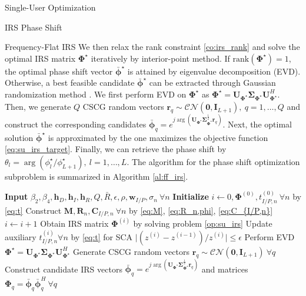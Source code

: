 \documentclass{IEEEtran}
\begin{document}
\begin{section}{Single-User Optimization}
\begin{subsection}{IRS Phase Shift}
\begin{subsubsection}{Frequency-Flat IRS}
			We then relax the rank constraint \ref{co:irs_rank} and solve the optimal IRS matrix $\boldsymbol{\Phi}^{\star}$ iteratively by interior-point method. If $\mathrm{rank}(\boldsymbol{\Phi}^{\star})=1$, the optimal phase shift vector $\bar{\boldsymbol{\phi}}^\star$ is attained by eigenvalue decomposition (EVD). Otherwise, a best feasible candidate $\bar{\boldsymbol{\phi}}^\star$ can be extracted through Gaussian randomization method \cite{Huang2010}. We first perform EVD on $\boldsymbol{\Phi}^{\star}$ as $\boldsymbol{\Phi}^{\star}=\boldsymbol{U}_{\boldsymbol{\Phi}^{\star}}\boldsymbol{\Sigma}_{\boldsymbol{\Phi}^{\star}}\boldsymbol{U}_{\boldsymbol{\Phi}^{\star}}^H$. Then, we generate $Q$ CSCG random vectors $\boldsymbol{r}_q \sim \mathcal{CN}(\boldsymbol{0},\boldsymbol{I}_{L+1}),\ q=1,\dots,Q$ and construct the corresponding candidates $\bar{\boldsymbol{\phi}}_q=e^{j\arg\left(\boldsymbol{U}_{\boldsymbol{\Phi}^{\star}}\boldsymbol{\Sigma}_{\boldsymbol{\Phi}^{\star}}^{\frac{1}{2}}\boldsymbol{r}_q\right)}$. Next, the optimal solution $\bar{\boldsymbol{\phi}}^\star$ is approximated by the one maximizes the objective function \ref{eq:su_irs_target}. Finally, we can retrieve the phase shift by $\theta_l=\arg(\phi_l^\star/\phi_{L+1}^\star), \ l=1,\dots,L$. The algorithm for the phase shift optimization subproblem is summarized in Algorithm \ref{al:ff_irs}.
			\begin{algorithm}
				\caption{FF-IRS: Phase Shift}
				\label{al:ff_irs}
				\begin{algorithmic}[1]
					\State \textbf{Input} $\beta_2,\beta_4,\boldsymbol{h}_D,\boldsymbol{h}_I,\boldsymbol{h}_R,Q,\bar{R},\epsilon,\rho,\boldsymbol{w}_{I/P},\sigma_n \ \forall n$
					\State \textbf{Initialize} $i \gets 0,\boldsymbol{\Phi}^{(0)},t_{I/P,n}^{(0)}\ \forall n$ by \ref{eq:t}
					\State Construct $\boldsymbol{M},\boldsymbol{R}_n,\boldsymbol{C}_{I/P,n} \ \forall n$ by \ref{eq:M}, \ref{eq:R_n,phi}, \ref{eq:C_{I/P,n}}
					\Repeat
					\State $i \gets i + 1$
					\State Obtain IRS matrix $\boldsymbol{\Phi}^{(i)}$ by solving problem \ref{op:su_irs}
					\State Update auxiliary $t_{I/P,n}^{(i)} \forall n$ by \ref{eq:t} for SCA
					\Until $\lvert (z^{(i)}-z^{(i-1)}) / z^{(i)} \rvert \le \epsilon$
					\State Perform EVD $\boldsymbol{\Phi}^{\star}=\boldsymbol{U}_{\boldsymbol{\Phi}^{\star}}\boldsymbol{\Sigma}_{\boldsymbol{\Phi}^{\star}}\boldsymbol{U}_{\boldsymbol{\Phi}^{\star}}^H$
					\State Generate CSCG random vectors $\boldsymbol{r}_q \sim \mathcal{CN}(\boldsymbol{0},\boldsymbol{I}_{L+1}) \ \forall q$
					\State Construct candidate IRS vectors $\bar{\boldsymbol{\phi}}_q=e^{j\arg\left(\boldsymbol{U}_{\boldsymbol{\Phi}^{\star}}\boldsymbol{\Sigma}_{\boldsymbol{\Phi}^{\star}}^{\frac{1}{2}}\boldsymbol{r}_q\right)}$ and matrices $\boldsymbol{\Phi}_q=\bar{\boldsymbol{\phi}}_q\bar{\boldsymbol{\phi}}_q^H  \ \forall q$

\end{algorithmic}
\end{algorithm}
\end{subsubsection}
\end{subsection}
\end{section}
\end{document}

